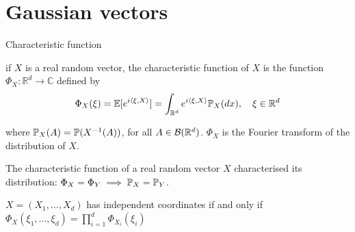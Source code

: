 \documentclass[10pt]{beamer}
\begin{document}


 


  \section{Gaussian vectors}

  \begin{frame}{Characteristic function}

    \begin{definition}
      if $X$ is a real random vector, the characteristic function of $X$ is the function
      $\Phi_{X}: \mathbb{R}^{d} \longrightarrow \mathbb{C}$ defined by
      $$
      \Phi_{X}(\xi)=\E[e^{i\langle \xi,X \rangle}] = \int_{\Rd} e^{i\langle \xi,X \rangle} \P_{X}(d x), \quad \xi \in \mathbb{R}^{d}
      $$

    where $\P_X(A) = \P(X^{-1}(A))$, for all $A \in \cB(\Rd)$. $\Phi_{X}$ is the Fourier transform of the distribution of $X$.
    \end{definition}

    \pause

    \begin{theorem}
      The characteristic function of a real random vector $X$ characterised its
      distribution: $\Phi_X = \Phi_Y \implies \P_X = \P_Y$.
    \end{theorem}

    \pause

    
    \begin{corollary}
      $X=(X_1,\ldots,X_d)$ has independent coordinates if and only if \\
      $\Phi_{X}\left(\xi_{1}, \ldots, \xi_{d}\right)=\prod_{i=1}^{d}
      \Phi_{X_{i}}\left(\xi_{i}\right)$
    \end{corollary}
  \end{frame}
\end{document}
